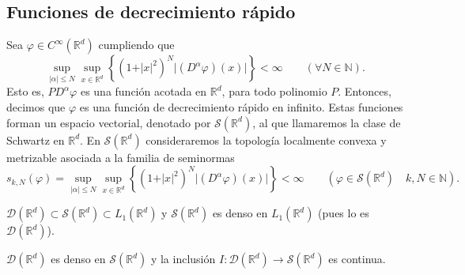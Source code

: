 \subsection{Funciones de decrecimiento rápido}

\begin{definicion}
Sea $\varphi\in C^{\infty}(\mathds{R}^{d})$ cumpliendo que 
\begin{equation}
\sup_{\vert \alpha \vert \leq N}\sup_{x\in\mathds{R}^{d}}\left\{ (1 + \vert x \vert^{2})^{N} \vert (D^{\alpha}\varphi)(x) \vert\right\} < \infty \qquad(\forall N\in\mathds{N}).
\end{equation}
Esto es, $PD^{\alpha} \varphi$ es una función acotada en $\mathds{R}^{d}$, para todo polinomio $P$. 
Entonces, decimos que $\varphi$ es una función de decrecimiento rápido en infinito. Estas funciones forman un espacio vectorial, denotado por $\mathcal{S}(\mathds{R}^{d})$, al que llamaremos la clase de Schwartz en $\mathds{R}^{d}$. En $\mathcal{S}(\mathds{R}^{d})$ consideraremos la topología localmente convexa y metrizable asociada a la familia de seminormas
\begin{equation}
s_{k,N}(\varphi) = \sup_{\vert \alpha \vert \leq N}\sup_{x\in\mathds{R}^{d}} \left\{ (1 + \vert x \vert^{2})^{N} \vert (D^{\alpha}\varphi)(x) \vert \right\} < \infty \qquad (\varphi\in \mathcal{S}(\mathds{R}^{d})\quad  k,N\in\mathds{N}).
\end{equation}
\end{definicion}
\begin{observacion}
$\mathcal{D}(\mathds{R}^{d})\subset \mathcal{S}(\mathds{R}^{d}) \subset L_{1}(\mathds{R}^{d})$ y $\mathcal{S}(\mathds{R}^{d})$ es denso en $L_{1}(\mathds{R}^{d})$ (pues lo es $\mathcal{D}(\mathds{R}^{d})$). 
\end{observacion}
\begin{proposicion}

$\mathcal{D}(\mathds{R}^{d})$ es denso en $\mathcal{S}(\mathds{R}^{d})$ y la inclusión $I:\mathcal{D}(\mathds{R}^{d})\rightarrow\mathcal{S}(\mathds{R}^{d})$ es continua.
\end{proposicion}

